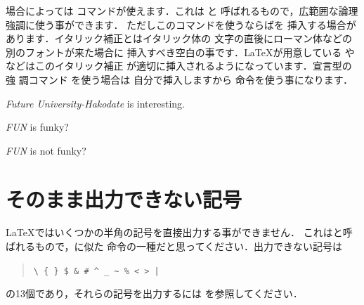 場合によっては  コマンドが使えます．これは
と
呼ばれるもので，広範囲な論理強調に使う事ができます．
ただしこのコマンドを使うならばを
挿入する場合があります．イタリック補正とはイタリック体の
文字の直後にローマン体などの別のフォントが来た場合に
挿入すべき空白の事です．{\LaTeX}が用意している  
や などはこのイタリック補正
が適切に挿入されるようになっています．宣言型の強
調コマンド を使う場合は%
自分で挿入しますから \cmd{/} 命令を使う事になります．%
\begin{InOut}
\emph{Future University-Hakodate} 
is interesting.\par 
{\em FUN\/} is funky?\par
{\em FUN} is not funky?
\end{InOut}


\section{そのまま出力できない記号}
{\LaTeX}ではいくつかの半角の記号を直接出力する事ができません．
これはと呼ばれるもので，\qu{\texttt\bs}に似た
命令の一種だと思ってください．出力できない記号は
\begin{quote}
 \verb+\ { } $ & # ^ _ ~ % < > |+
\end{quote}
の13個であり，それらの記号を出力するには
を参照してください．

